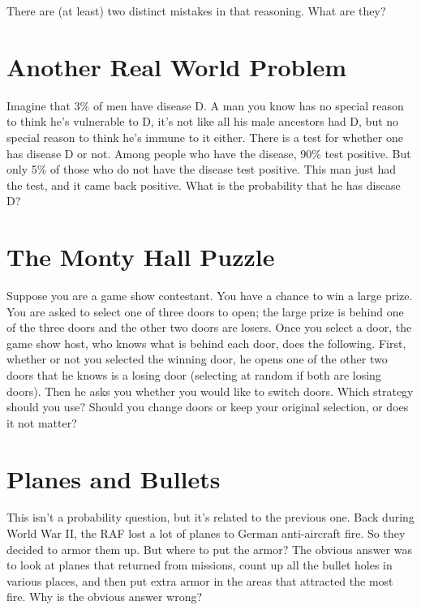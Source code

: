 There are (at least) two distinct mistakes in that reasoning. What are they?

\section{Another Real World Problem}
\label{anotherrealworldproblem}

Imagine that 3\% of men have disease D. A man you know has no special reason to think he's vulnerable to D, it's not like all his male ancestors had D, but no special reason to think he's immune to it either. There is a test for whether one has disease D or not. Among people who have the disease, 90\% test positive. But only 5\% of those who do not have the disease test positive. This man just had the test, and it came back positive. What is the probability that he has disease D?

\section{The Monty Hall Puzzle}
\label{themontyhallpuzzle}

Suppose you are a game show contestant. You have a chance to win a large prize. You are asked to select one of three doors to open; the large prize is behind one of the three doors and the other two doors are losers. Once you select a door, the game show host, who knows what is behind each door, does the following. First, whether or not you selected the winning door, he opens one of the other two doors that he knows is a losing door (selecting at random if both are losing doors). Then he asks you whether you would like to switch doors. Which strategy should you use? Should you change doors or keep your original selection, or does it not matter?

\section{Planes and Bullets}
\label{planesandbullets}

This isn't a probability question, but it's related to the previous one. Back during World War II, the RAF lost a lot of planes to German anti-aircraft fire. So they decided to armor them up. But where to put the armor? The obvious answer was to look at planes that returned from missions, count up all the bullet holes in various places, and then put extra armor in the areas that attracted the most fire. Why is the obvious answer wrong?

